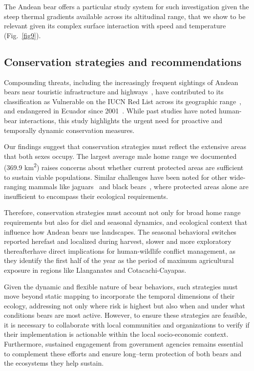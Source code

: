 \documentclass[lineno,referee,pdflatex,sn-vancouver-num]{sn-jnl}%
\theoremstyle{thmstyleone}%
\theoremstyle{thmstyletwo}%
\theoremstyle{thmstylethree}%
\begin{document}
The Andean bear offers a particular study system for such investigation given the steep thermal gradients available across its altitudinal range, that we show to be relevant given its complex surface interaction with speed and temperature (Fig.~\ref{fig9}).

\subsection{Conservation strategies and recommendations}

Compounding threats, including the increasingly frequent sightings of Andean bears near touristic infrastructure and highways~\cite{castellanosAreReportsCub2019}, have contributed to its classification as Vulnerable on the IUCN Red List across its geographic range~\cite{velez-liendoTremarctosOrnatusIUCN2016}, and endangered in Ecuador since 2001~\cite{cuestaOsoAnteojos2001}.
While past studies have noted human-bear interactions, this study highlights the urgent need for proactive and temporally dynamic conservation measures.

Our findings suggest that conservation strategies must reflect the extensive areas that both sexes occupy. The largest average male home range we documented (369.9 km\textsuperscript{2}) raises concerns about whether current protected areas are sufficient to sustain viable populations.
Similar challenges have been noted for other wide-ranging mammals like jaguars~\cite{delatorreHabitatAvailabilityConnectivity2017} and black bears~\cite{zellerBlackBearsAlter2019}, where protected areas alone are insufficient to encompass their ecological requirements.

Therefore, conservation strategies must account not only for broad home range requirements but
also for diel and seasonal dynamics, and ecological context that influence how Andean bears use
landscapes. The seasonal behavioral switches reported here\textemdash fast and localized during harvest, slower and more exploratory thereafter\textemdash have direct implications for human-wildlife conflict management, as they identify the first half of the year as the period of maximum agricultural exposure in regions like Llanganates and Cotacachi-Cayapas.

Given the dynamic and flexible nature of bear behaviors, such strategies must move beyond static mapping to incorporate the temporal dimensions of their ecology, addressing not only where risk is highest but also when and under what conditions bears are most active. However, to ensure these strategies are feasible, it is necessary to collaborate with local communities and organizations to verify if their implementation is actionable within the local socio-economic context.
Furthermore, sustained engagement from government agencies remains essential to complement these efforts and ensure long–term protection of both bears and the ecosystems they help sustain.
\end{document}
